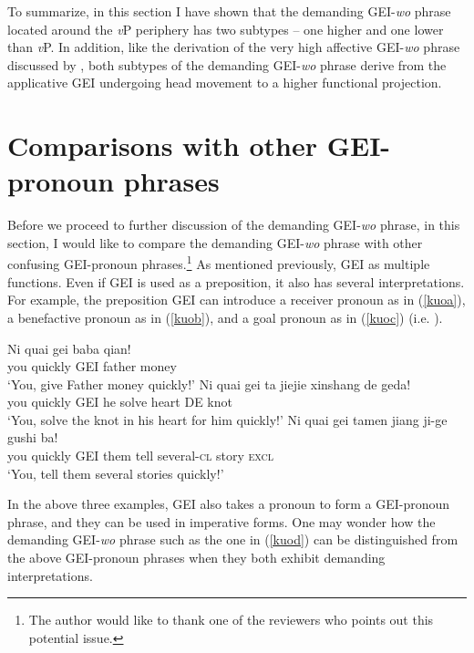 \documentclass[output=paper,colorlinks,citecolor=brown]{langscibook}
\begin{document}
To summarize, in this section I have shown that the demanding GEI-\textit{wo} phrase located around the \textit{v}P periphery has two subtypes -- one higher and one lower than \textit{v}P. In addition, like the derivation of the very high affective GEI-\textit{wo} phrase discussed by \citet{Tsai2017}, both subtypes of the demanding GEI-\textit{wo} phrase derive from the applicative GEI undergoing head movement to a higher functional projection. 

\section{Comparisons with other GEI-pronoun phrases}\label{sect4}

Before we proceed to further discussion of the demanding GEI-\textit{wo} phrase, in this section, I would like to compare the demanding GEI-\textit{wo} phrase with other confusing GEI-pronoun phrases.\footnote{The author would like to thank one of the reviewers who points out this potential issue.} As mentioned previously, GEI as multiple functions. Even if GEI is used as a preposition, it also has several interpretations. For example, the preposition GEI can introduce a receiver pronoun as in (\ref{kuoa}), a benefactive pronoun as in (\ref{kuob}), and a goal pronoun as in (\ref{kuoc}) (i.e. \citealt{Liu&Pan&Gu}). 

\ea
\label{kuoa}
\gll Ni     quai    gei baba    qian!\\  
     you    quickly GEI father  money\\ 
\glt `You, give Father money quickly!'
\ex
\label{kuob}
\gll Ni     quai    gei ta  jiejie  xinshang    de  geda!\\  
     you    quickly GEI he  solve   heart       DE  knot\\ 
\glt `You, solve the knot in his heart for him quickly!'
\ex
\label{kuoc}
\gll Ni     quai    gei tamen   jiang   ji-ge       gushi   ba!\\  
     you    quickly GEI them      tell    several-\textsc{cl}  story   \textsc{excl}\\ 
\glt `You, tell them several stories quickly!'
\z

In the above three examples, GEI also takes a pronoun to form a GEI-pronoun phrase, and they can be used in imperative forms. One may wonder how the demanding GEI-\textit{wo} phrase such as the one in (\ref{kuod}) can be distinguished from the above GEI-pronoun phrases when they both exhibit demanding interpretations.
\end{document}
